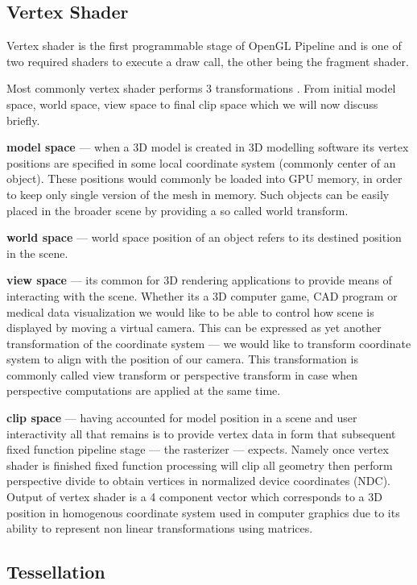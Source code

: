 \subsection{Vertex Shader}

Vertex shader is the first programmable stage of OpenGL Pipeline and is one of two required shaders to execute a draw call, the other being the fragment shader.

Most commonly vertex shader performs 3 transformations \cite{glsuperbible}. From initial model space, world space, view space to final clip space which we will now discuss briefly.

\textbf{model space} --- when a 3D model is created in 3D modelling software its vertex positions are specified in some local coordinate system (commonly center of an object).
These positions would commonly be loaded into GPU memory, in order to keep only single version of the mesh in memory.
Such objects can be easily placed in the broader scene by providing a so called world transform.

\textbf{world space} --- world space position of an object refers to its destined position in the scene.

\textbf{view space} --- its common for 3D rendering applications to provide means of interacting with the scene. Whether its a 3D computer game, CAD program or medical data visualization we would like to be able to 
control how scene is displayed by moving a virtual camera. This can be expressed as yet another transformation of the coordinate system --- we would like to transform coordinate system to align with the position of our camera.
This transformation is commonly called view transform or perspective transform in case when perspective computations are applied at the same time.

\textbf{clip space} --- having accounted for model position in a scene and user interactivity all that remains is to provide vertex data in form that subsequent fixed function pipeline stage --- the rasterizer --- expects.
Namely once vertex shader is finished fixed function processing will clip all geometry then perform perspective divide to obtain vertices in normalized device coordinates (NDC).
Output of vertex shader is a 4 component vector which corresponds to a 3D position in homogenous coordinate system used in computer graphics due to its ability to represent non linear transformations using matrices.

\subsection{Tessellation}

